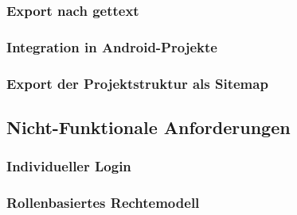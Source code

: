 \subsubsection{Export nach gettext}

\subsubsection{Integration in Android-Projekte}

\subsubsection{Export der Projektstruktur als Sitemap}

\subsection{Nicht-Funktionale Anforderungen}\label{l:nicht-funktionale-anforderungen}

\subsubsection{Individueller Login}

\subsubsection{Rollenbasiertes Rechtemodell}

\pagebreak